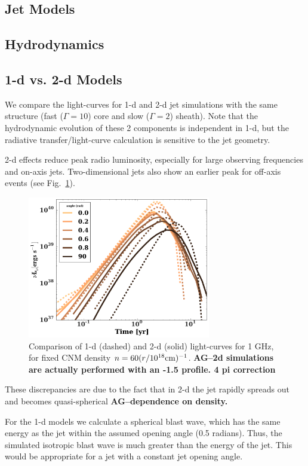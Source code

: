 \documentclass[usenatbib,fleqn]{mnras}
\begin{document}
\subsection{Jet Models}

\subsection{Hydrodynamics}

\subsection{1-d vs. 2-d Models}
\label{sec:2d}
We compare the light-curves for 1-d and 2-d jet simulations with the
same structure (fast ($\Gamma=10$) core and slow ($\Gamma=2$)
sheath). Note that the hydrodynamic evolution of these 2 components is
independent in 1-d, but the radiative transfer/light-curve calculation
is sensitive to the jet geometry.

2-d effects reduce peak radio luminosity, especially for large
observing frequencies and on-axis jets. Two-dimensional jets also show
an earlier peak for off-axis events (see Fig.~\ref{fig:1d2d}).

\begin{figure}
\includegraphics[width=8cm]{comparison_1ghz.pdf}
\caption{\label{fig:1d2d} Comparison of 1-d (dashed) and 2-d (solid)
  light-curves for 1 GHz, for fixed CNM density $n=60
    (r/10^{18} {\rm cm})^{-1}$. {\bf AG--2d simulations are actually
      performed with an -1.5 profile. 4 pi correction}}
\end{figure}

These discrepancies are due to the fact that in 2-d the jet rapidly
spreads out and becomes quasi-spherical {\bf AG--dependence on
  density.} 

For the 1-d models we calculate a spherical blast wave, which has the
same energy as the jet within the assumed opening angle (0.5 radians).
Thus, the simulated isotropic blast wave is much greater than the energy of
the jet. This would be appropriate for a jet with a constant jet
opening angle.
\end{document}
